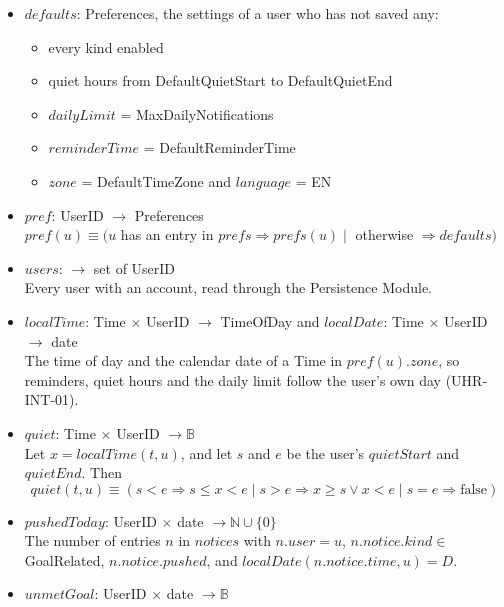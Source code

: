 \documentclass[12pt, titlepage]{article}
\begin{document}
\begin{itemize}
\item $\mathit{defaults}$: Preferences, the settings of a user who has not
  saved any:
  \begin{itemize}
  \item every kind enabled
  \item quiet hours from \textsf{DefaultQuietStart} to
    \textsf{DefaultQuietEnd}
  \item $\mathit{dailyLimit}$ = \textsf{MaxDailyNotifications}
  \item $\mathit{reminderTime}$ = \textsf{DefaultReminderTime}
  \item $\mathit{zone}$ = \textsf{DefaultTimeZone} and $\mathit{language}$
    = EN
  \end{itemize}
\item $\mathit{pref}$: UserID $\rightarrow$ Preferences\\
  $\mathit{pref}(u) \equiv (u$ has an entry in $\mathit{prefs} \Rightarrow
  \mathit{prefs}(u) \mid$ otherwise $\Rightarrow \mathit{defaults})$
\item $\mathit{users}$: $\rightarrow$ set of UserID\\
  Every user with an account, read through the Persistence Module.
\item $\mathit{localTime}$: Time $\times$ UserID $\rightarrow$ TimeOfDay and
  $\mathit{localDate}$: Time $\times$ UserID $\rightarrow$ date\\
  The time of day and the calendar date of a Time in
  $\mathit{pref}(u).\mathit{zone}$, so reminders, quiet hours and the daily
  limit follow the user's own day (UHR-INT-01).
\item $\mathit{quiet}$: Time $\times$ UserID $\rightarrow \mathbb{B}$\\
  Let $x = \mathit{localTime}(t, u)$, and let $s$ and $e$ be the user's
  $\mathit{quietStart}$ and $\mathit{quietEnd}$. Then
  \[
  \mathit{quiet}(t, u) \equiv (s < e \Rightarrow s \leq x < e \mid s > e
  \Rightarrow x \geq s \vee x < e \mid s = e \Rightarrow \mathrm{false})
  \]
\item $\mathit{pushedToday}$: UserID $\times$ date $\rightarrow \mathbb{N}
  \cup \{0\}$\\
  The number of entries $n$ in $\mathit{notices}$ with $n.\mathit{user} = u$,
  $n.\mathit{notice}.\mathit{kind} \in$ GoalRelated,
  $n.\mathit{notice}.\mathit{pushed}$, and
  $\mathit{localDate}(n.\mathit{notice}.\mathit{time}, u) = D$.
\item $\mathit{unmetGoal}$: UserID $\times$ date $\rightarrow \mathbb{B}$\\

\end{itemize}
\end{document}
